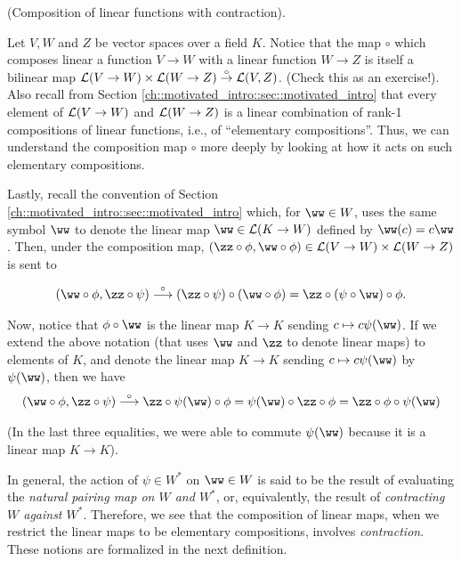 \begin{deriv}
\label{ch::intro_to_tensors::deriv::compos_linear_map_with_contract}
    (Composition of linear functions with contraction). 
    
    Let $V, W$ and $Z$ be vector spaces over a field $K$. Notice that the map $\circ$ which composes linear a function $V \rightarrow W$ with a linear function $W \rightarrow Z$ is itself a bilinear map $\mathcal{L}(V \rightarrow W) \times \mathcal{L}(W \rightarrow Z) \overset{\circ}{\rightarrow} \mathcal{L}(V, Z)$. (Check this as an exercise!). Also recall from Section \ref{ch::motivated_intro::sec::motivated_intro} that every element of $\mathcal{L}(V \rightarrow W)$ and $\mathcal{L}(W \rightarrow Z)$ is a linear combination of rank-1 compositions of linear functions, i.e., of ``elementary compositions''. Thus, we can understand the composition map $\circ$ more deeply by looking at how it acts on such elementary compositions. 
    
    Lastly, recall the convention of Section \ref{ch::motivated_intro::sec::motivated_intro} which, for $\ww \in W$, uses the same symbol $\ww$ to denote the linear map $\ww \in \LLLL(K \rightarrow W)$ defined by $\ww(c) = c\ww$. Then, under the composition map, ${(\zz \circ \phi, \ww \circ \phi) \in \LLLL(V \rightarrow W) \times \LLLL(W \rightarrow Z)}$ is sent to
    
    \begin{align*}
        (\ww \circ \phi, \zz \circ \psi) \overset{\circ}{\longrightarrow} (\zz \circ \psi) \circ (\ww \circ \phi) = \zz \circ (\psi \circ \ww) \circ \phi.
    \end{align*}
    
    Now, notice that $\phi \circ \ww$ is the linear map $K \rightarrow K$ sending $c \mapsto c\psi(\ww)$. If we extend the above notation (that uses $\ww$ and $\zz$ to denote linear maps) to elements of $K$, and denote the linear map $K \rightarrow K$ sending $c \mapsto c\psi(\ww)$ by $\psi(\ww)$, then we have 
    \begin{align*}
        (\ww \circ \phi, \zz \circ \psi) \overset{\circ}{\longrightarrow} \zz \circ \psi(\ww) \circ \phi = \psi(\ww) \circ \zz \circ \phi = \zz \circ \phi \circ \psi(\ww)
    \end{align*}
    
    (In the last three equalities, we were able to commute $\psi(\ww)$ because it is a linear map $K \rightarrow K$).
    
    In general, the action of $\psi \in W^*$ on $\ww \in W$ is said to be the result of evaluating the \textit{natural pairing map on $W$ and $W^*$}, or, equivalently, the result of \textit{contracting $W$ against $W^*$}. Therefore, we see that the composition of linear maps, when we restrict the linear maps to be elementary compositions, involves \textit{contraction}. These notions are formalized in the next definition.
\end{deriv}

